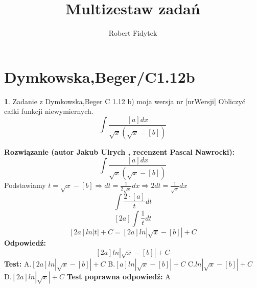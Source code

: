 \documentclass[12pt, a4paper]{article}
\title{Multizestaw zadań}
\author{Robert Fidytek}
\date{}
\theoremstyle{definition} %
\newtheorem{zad}{}
\newcommand{\kategoria}[1]{\section{#1}} %
\newcommand{\zadStart}[1]{\begin{zad}#1\newline} %
\newcommand{\zadStop}{\end{zad}}   %
\newcommand{\rozwStart}[2]{\noindent \textbf{Rozwiązanie (autor #1 , recenzent #2): }\newline} %
\newcommand{\rozwStop}{\newline}                                            %
\newcommand{\odpStart}{\noindent \textbf{Odpowiedź:}\newline}    %
\newcommand{\odpStop}{\newline}                                             %
\newcommand{\testStart}{\noindent \textbf{Test:}\newline} %
\newcommand{\testStop}{\newline} %
\newcommand{\kluczStart}{\noindent \textbf{Test poprawna odpowiedź:}\newline} %
\newcommand{\kluczStop}{\newline} %
\begin{document}
\maketitle


\kategoria{Dymkowska,Beger/C1.12b}
\zadStart{Zadanie z Dymkowska,Beger C 1.12 b) moja wersja nr [nrWersji]}
Obliczyć całki funkcji niewymiernych.$$\int\frac{[a]dx}{\sqrt{x}(\sqrt{x}-[b])}$$
\zadStop
\rozwStart{Jakub Ulrych}{Pascal Nawrocki}
$$\int\frac{[a]dx}{\sqrt{x}(\sqrt{x}-[b])}$$
Podstawiamy $t=\sqrt{x}-[b]\Rightarrow dt=\frac{1}{2\sqrt{x}}dx \Rightarrow2dt=\frac{1}{\sqrt{x}}dx$
$$\int\frac{2\cdot[a]}{t}dt$$
$$[2a]\int\frac{1}{t}dt$$
$$[2a]ln|t|+C=[2a]ln|\sqrt{x}-[b]|+C$$
\rozwStop
\odpStart
$$[2a]ln|\sqrt{x}-[b]|+C$$
\odpStop
\testStart
A.$[2a]ln|\sqrt{x}-[b]|+C$
B.$[a]ln|\sqrt{x}-[b]|+C$
C.$ln|\sqrt{x}-[b]|+C$
D.$[2a]ln|\sqrt{x}|+C$
\testStop
\kluczStart
A
\kluczStop
\end{document}
